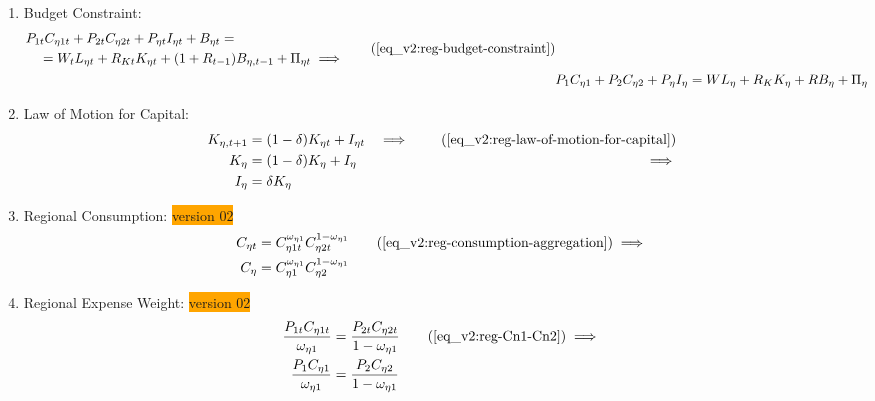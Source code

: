 \documentclass[../thesis.tex]{subfiles}
\begin{document}
\begin{enumerate}

	\item Budget Constraint: 
	\begin{align}
	\begin{split}
		& P_{1 t} C_{\eta 1 t} + P_{2 t} C_{\eta 2 t} + P_{\eta t} I_{\eta t} + B_{\eta t} = \\ & \quad = W_t L_{\eta t} + R_{Kt} K_{\eta t} + (1 + R_{t-1}) B_{\eta,t-1} + \Pi_{\eta t} \implies
	\end{split} \tag{\ref{eq_v2:reg-budget-constraint}}
	\\
	& P_{1} C_{\eta 1} + P_{2} C_{\eta 2} + P_{\eta} I_{\eta} = W L_{\eta} + R_{K} K_{\eta} + R B_{\eta} + \Pi_{\eta} \label{eq_v2:reg-ss-budget-constraint}
	\end{align}

	\item Law of Motion for Capital:
	\begin{alignat}{2}
		K_{\eta, t+1} &= (1-\delta)K_{\eta t} + I_{\eta t} &\implies \tag{\ref{eq_v2:reg-law-of-motion-for-capital}} \\
		K_{\eta} &= (1-\delta)K_{\eta} + I_{\eta} &\implies \nonumber \\
		I_{\eta} &= \delta K_{\eta} \label{eq_v2:reg-ss-law-of-motion-for-capital}
	\end{alignat}

	\item Regional Consumption: \colorbox{orange}{version 02}
	\begin{align}
		C_{\eta t} &= C_{\eta 1 t}^{\omega_{\eta 1}} C_{\eta 2 t}^{1-\omega_{\eta 1}} \tag{\ref{eq_v2:reg-consumption-aggregation}} \implies \\
		C_{\eta} &= C_{\eta 1}^{\omega_{\eta 1}} C_{\eta 2}^{1-\omega_{\eta 1}} \label{eq_v2:reg-ss-consumption-aggregation}
	\end{align}
	
	\item Regional Expense Weight: \colorbox{orange}{version 02}
	\begin{align}
		\frac{P_{1 t} C_{\eta 1 t}}{\omega_{\eta 1}} &= \frac{P_{2 t} C_{\eta 2 t}}{1 -\omega_{\eta 1}} \tag{\ref{eq_v2:reg-Cn1-Cn2}} \implies \\
		\frac{P_{1} C_{\eta 1}}{\omega_{\eta 1}} &= \frac{P_{2} C_{\eta 2}}{1 -\omega_{\eta 1}} \label{eq_v2:reg-ss-Cn1-Cn2}
	\end{align}

\begin{comment}


\end{comment}
\end{enumerate}
\end{document}
